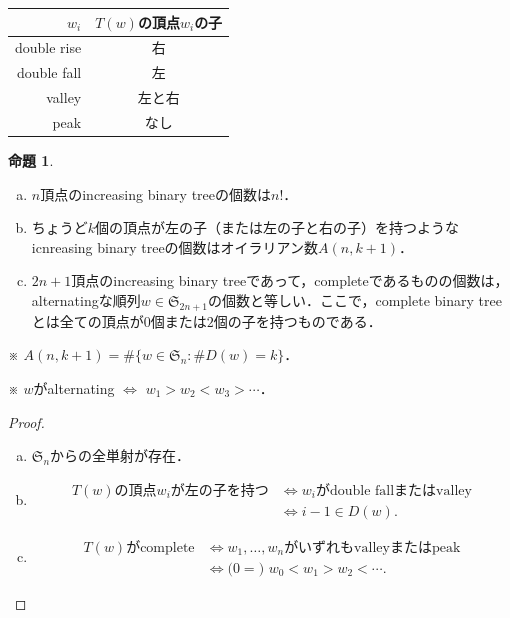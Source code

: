 \documentclass[xelatex,ja=standard,a4paper,14pt,everyparhook=compat]{bxjsarticle}
\newcommand{\fS}{\mathfrak{S}}
\theoremstyle{definition}
\newtheorem{proposition}[theorem]{命題}
\begin{document}
\begin{table}
    \centering
    \begin{tabular}{r | c}
        $w_i$       & $T(w)$の頂点$w_i$の子 \\
        \hline
        double rise & 右                    \\
        double fall & 左                    \\
        valley      & 左と右                \\
        peak        & なし                  \\
    \end{tabular}
\end{table}

\begin{proposition}
    \begin{enumerate}[(a)]
        \item $n$頂点のincreasing binary treeの個数は$n!$．
        \item ちょうど$k$個の頂点が左の子（または左の子と右の子）を持つようなicnreasing binary treeの個数はオイラリアン数$A(n, k+1)$．
        \item $2n+1$頂点のincreasing binary treeであって，completeであるものの個数は，alternatingな順列$w \in \fS_{2n+1}$の個数と等しい．ここで，complete binary treeとは全ての頂点が$0$個または$2$個の子を持つものである．
    \end{enumerate}
\end{proposition}

※ $A(n, k+1) = \#\{w \in \fS_n : \#D(w) = k\}$．

※ $w$がalternating $\Longleftrightarrow$ $w_1 > w_2 < w_3 > \cdots$．

\begin{proof}
    \begin{enumerate}[(a)]
        \item $\fS_n$からの全単射が存在．
        \item \begin{align*}
                  \text{$T(w)$の頂点$w_i$が左の子を持つ}
                   & \Longleftrightarrow \text{$w_i$がdouble fallまたはvalley} \\
                   & \Longleftrightarrow i-1 \in D(w).
              \end{align*}
        \item \begin{align*}
                  \text{$T(w)$がcomplete}
                  & \Longleftrightarrow \text{$w_1,\ldots,w_n$がいずれもvalleyまたはpeak} \\
                  & \Longleftrightarrow \text{($0 =$) $w_0 < w_1 > w_2 < \cdots$}.
              \end{align*}
    \end{enumerate}
\end{proof}
\end{document}
